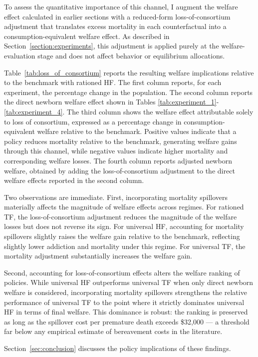 \documentclass[parskip=full]{article}
\theoremstyle{plain}
\theoremstyle{definition}
\theoremstyle{remark}
\begin{document}
To assess the quantitative importance of this channel, I augment the welfare effect calculated in earlier sections with a reduced-form loss-of-consortium adjustment that translates excess mortality in each counterfactual into a consumption-equivalent welfare effect. As described in Section~\ref{section:experiments}, this adjustment is applied purely at the welfare-evaluation stage and does not affect behavior or equilibrium allocations.

Table~\ref{tab:loss_of_consortium} reports the resulting welfare implications relative to the benchmark with rationed HF. The first column reports, for each experiment, the percentage change in the population. The second column reports the direct newborn welfare effect shown in Tables \ref{tab:experiment_1}-\ref{tab:experiment_4}. The third column shows the welfare effect attributable solely to loss of consortium, expressed as a percentage change in consumption-equivalent welfare relative to the benchmark. Positive values indicate that a policy reduces mortality relative to the benchmark, generating welfare gains through this channel, while negative values indicate higher mortality and corresponding welfare losses. The fourth column reports adjusted newborn welfare, obtained by adding the loss-of-consortium adjustment to the direct welfare effects reported in the second column.

Two observations are immediate. First, incorporating mortality spillovers materially affects the magnitude of welfare effects across regimes. For rationed TF, the loss-of-consortium adjustment reduces the magnitude of the welfare losses but does not reverse its sign. For universal HF, accounting for mortality spillovers slightly raises the welfare gain relative to the benchmark, reflecting slightly lower addiction and mortality under this regime. For universal TF, the mortality adjustment substantially increases the welfare gain.

Second, accounting for loss-of-consortium effects alters the welfare ranking of policies. While universal HF outperforms universal TF when only direct newborn welfare is considered, incorporating mortality spillovers strengthens the relative performance of universal TF to the point where it strictly dominates universal HF in terms of final welfare. This dominance is robust: the ranking is preserved as long 
as the spillover cost per premature death exceeds \$32{,}000 — a threshold far below any empirical estimate of bereavement costs in the literature.

Section~\ref{sec:conclusion} discusses the policy implications of these findings.
\end{document}
